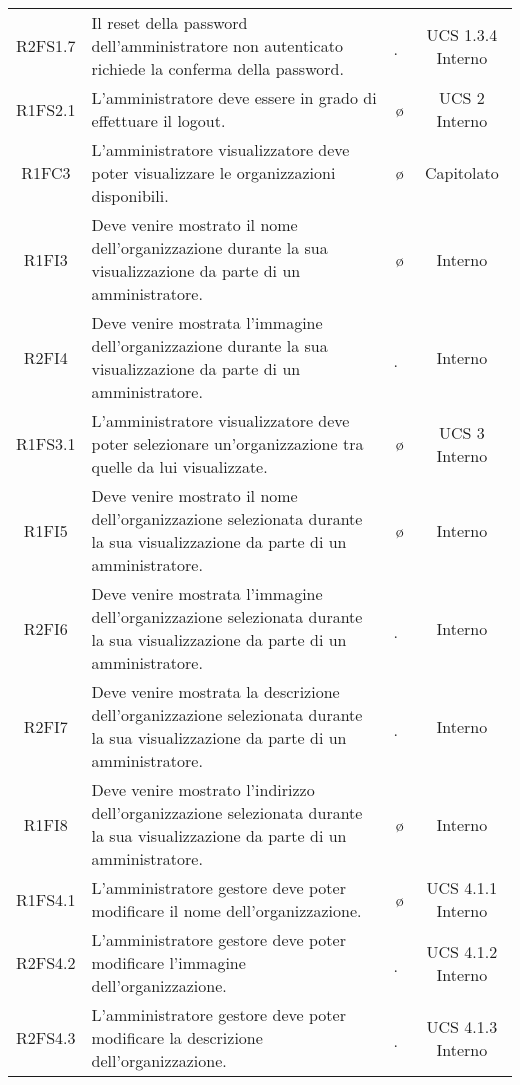 {\begin{longtable}{ c C{6.5cm} c c}
R2FS1.7 & Il reset della password dell'amministratore non autenticato richiede la conferma della password. & \d & UCS 1.3.4 Interno \\

R1FS2.1 & L'amministratore deve essere in grado di effettuare il logout. & \o & UCS 2 Interno\\

R1FC3 & L'amministratore visualizzatore deve poter visualizzare le organizzazioni disponibili. & \o & Capitolato\\

R1FI3 & Deve venire mostrato il nome dell'organizzazione durante la sua visualizzazione da parte di un amministratore. & \o & Interno\\

R2FI4 & Deve venire mostrata l'immagine dell'organizzazione durante la sua visualizzazione da parte di un amministratore. & \d & Interno\\

R1FS3.1 & L'amministratore visualizzatore deve poter selezionare un'organizzazione tra quelle da lui visualizzate. & \o & UCS 3 Interno\\

R1FI5 & Deve venire mostrato il nome dell'organizzazione selezionata durante la sua visualizzazione da parte di un amministratore. & \o & Interno\\

R2FI6 & Deve venire mostrata l'immagine dell'organizzazione selezionata durante la sua visualizzazione da parte di un amministratore. & \d & Interno\\

R2FI7 & Deve venire mostrata la descrizione dell'organizzazione selezionata durante la sua visualizzazione da parte di un amministratore. & \d & Interno\\

R1FI8 & Deve venire mostrato l'indirizzo dell'organizzazione selezionata durante la sua visualizzazione da parte di un amministratore. & \o & Interno\\


R1FS4.1 & L'amministratore gestore deve poter modificare il nome dell'organizzazione. & \o & UCS 4.1.1 Interno\\

R2FS4.2 & L'amministratore gestore deve poter modificare l'immagine dell'organizzazione. & \d & UCS 4.1.2 Interno\\

R2FS4.3 & L'amministratore gestore deve poter modificare la descrizione dell'organizzazione. & \d & UCS 4.1.3 Interno\\


\end{longtable}}

